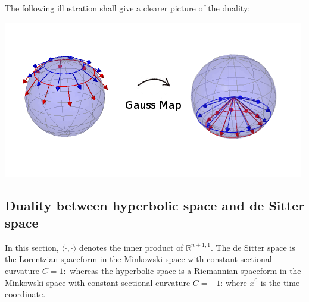 The following illustration shall give a clearer picture of the duality:

\includegraphics[width=\textwidth]{spherical_gaussmap}

\subsection{Duality between hyperbolic space and de Sitter space} In this section, $\langle \cdot,\cdot\rangle$ denotes the inner product of $\mathbb{R}^{n+1,1}.$
The de Sitter space is the Lorentzian spaceform in the Minkowski space with constant sectional curvature $C=1:$
whereas the hyperbolic space is a Riemannian spaceform in the Minkowski space with constant sectional curvature $C=-1$:
where $x^0$ is the time coordinate.

